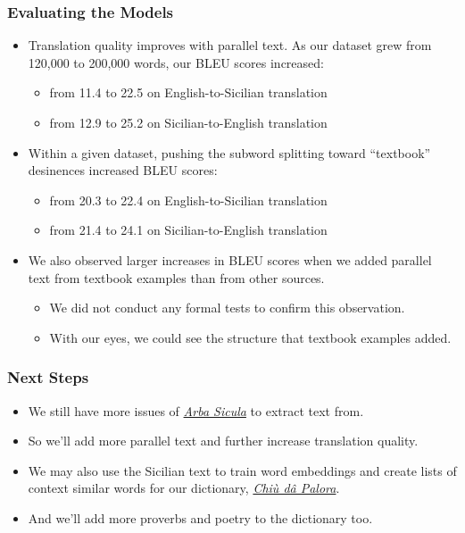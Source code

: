 \documentclass{beamer}
\begin{document}
\begin{frame}
  \frametitle{Evaluating the Models}
  \begin{itemize}
  \item Translation quality improves with parallel text.  As our dataset grew
    from 120,000 to 200,000 words, our BLEU scores increased:
    \begin{itemize}
    \item from 11.4 to 22.5 on English-to-Sicilian translation
    \item from 12.9 to 25.2 on Sicilian-to-English translation
    \end{itemize}
  \vspace{0.5em}
  \item Within a given dataset, pushing the subword splitting toward ``textbook'' desinences increased BLEU scores:
    \begin{itemize}
    \item from 20.3 to 22.4 on English-to-Sicilian translation
    \item from 21.4 to 24.1 on Sicilian-to-English translation
    \end{itemize}
  \vspace{0.5em}
  \item We also observed larger increases in BLEU scores when we added parallel text from 
    textbook examples than from other sources.
    \begin{itemize}
    \item We did not conduct any formal tests to confirm this observation.
    \item With our eyes, we could see the structure that textbook examples added.
    \end{itemize}
  \end{itemize} 
\end{frame}


\begin{frame}
  \frametitle{Next Steps}
  \begin{itemize}
  \item We still have more issues of \href{https://www.arbasicula.org/}{\textit{Arba Sicula}} to extract text from.
  \item So we'll add more parallel text and further increase translation quality.
    \vspace{1em}
  \item We may also use the Sicilian text to train word embeddings and create lists of context similar words for our dictionary,
    \href{https://www.napizia.com/cgi-bin/cchiu-da-palora.pl}{\textit{Chiù dâ Palora}}.
    \vspace{1em}
    \item And we'll add more proverbs and poetry to the dictionary too.
  \end{itemize}
\end{frame}
\end{document}
